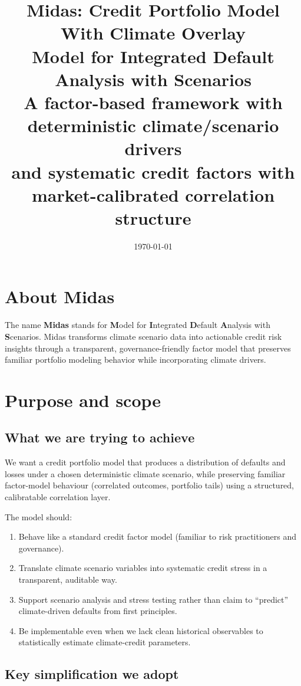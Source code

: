 \documentclass[11pt,a4paper]{article}
\title{\textbf{Midas: Credit Portfolio Model With Climate Overlay}\\
\large Model for Integrated Default Analysis with Scenarios\\[0.5em]
\normalsize A factor-based framework with deterministic climate/scenario drivers\\and systematic credit factors with market-calibrated correlation structure}
\author{}
\date{\today}
\begin{document}
\maketitle

\tableofcontents
\newpage

\section*{About Midas}

The name \textbf{Midas} stands for \textbf{M}odel for \textbf{I}ntegrated \textbf{D}efault \textbf{A}nalysis with \textbf{S}cenarios. Midas transforms climate scenario data into actionable credit risk insights through a transparent, governance-friendly factor model that preserves familiar portfolio modeling behavior while incorporating climate drivers.

\section{Purpose and scope}

\subsection{What we are trying to achieve}

We want a credit portfolio model that produces a distribution of defaults and losses under a chosen deterministic climate scenario, while preserving familiar factor-model behaviour (correlated outcomes, portfolio tails) using a structured, calibratable correlation layer.

The model should:

\begin{enumerate}
    \item Behave like a standard credit factor model (familiar to risk practitioners and governance).
    \item Translate climate scenario variables into systematic credit stress in a transparent, auditable way.
    \item Support scenario analysis and stress testing rather than claim to ``predict'' climate-driven defaults from first principles.
    \item Be implementable even when we lack clean historical observables to statistically estimate climate-credit parameters.
\end{enumerate}

\subsection{Key simplification we adopt}
\end{document}
